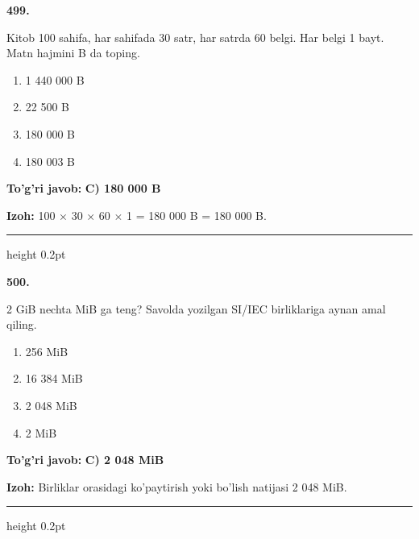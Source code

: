 \documentclass[10pt,a4paper,oneside]{article}
\begin{document}
\noindent\textbf{\color{ink}499.}
\par
Kitob 100 sahifa, har sahifada 30 satr, har satrda 60 belgi. Har belgi 1 bayt. Matn hajmini B da toping.
\begin{enumerate}[label=\Alph*),leftmargin=9mm]
\item 1 440 000 B
\item 22 500 B
\item 180 000 B
\item 180 003 B
\end{enumerate}
\begin{tcolorbox}[enhanced,breakable,colback=teal!4,colframe=teal!50!black,boxrule=0.5pt,arc=1.1mm,left=3mm,right=3mm,top=1.7mm,bottom=1.7mm,before skip=2mm,after skip=2mm]
\textbf{\color{teal}To'g'ri javob:} \textbf{C) 180 000 B}
\par\smallskip
\textbf{Izoh:} 100 \ensuremath{\times} 30 \ensuremath{\times} 60 \ensuremath{\times} 1 = 180 000 B = 180 000 B.
\end{tcolorbox}
\vspace{2mm}\hrule height 0.2pt \vspace{3mm}

\noindent\textbf{\color{ink}500.}
\par
2 GiB nechta MiB ga teng? Savolda yozilgan SI/IEC birliklariga aynan amal qiling.
\begin{enumerate}[label=\Alph*),leftmargin=9mm]
\item 256 MiB
\item 16 384 MiB
\item 2 048 MiB
\item 2 MiB
\end{enumerate}
\begin{tcolorbox}[enhanced,breakable,colback=teal!4,colframe=teal!50!black,boxrule=0.5pt,arc=1.1mm,left=3mm,right=3mm,top=1.7mm,bottom=1.7mm,before skip=2mm,after skip=2mm]
\textbf{\color{teal}To'g'ri javob:} \textbf{C) 2 048 MiB}
\par\smallskip
\textbf{Izoh:} Birliklar orasidagi ko'paytirish yoki bo'lish natijasi 2 048 MiB.
\end{tcolorbox}
\vspace{2mm}\hrule height 0.2pt \vspace{3mm}
\end{document}
